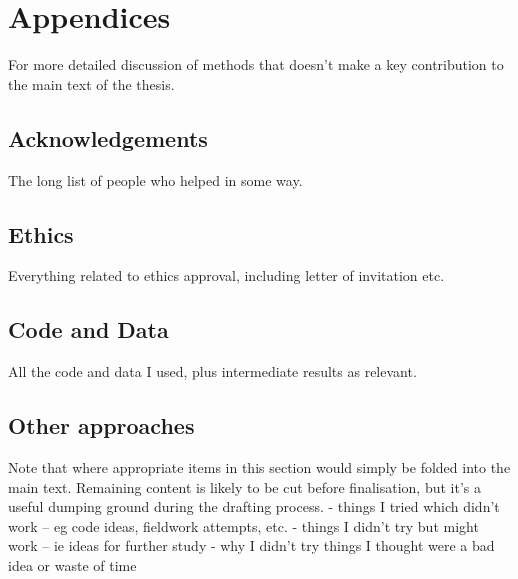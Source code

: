 \chapter{Appendices}
For more detailed discussion of methods that doesn't make a key contribution to the main text of the thesis.

\section{Acknowledgements}
The long list of people who helped in some way.

\section{Ethics} \label{sec:ethics}
Everything related to ethics approval, including letter of invitation etc.

\section{Code and Data}
All the code and data I used, plus intermediate results as relevant.

\section{Other approaches}
Note that where appropriate items in this section would simply be folded into the main text.  Remaining content is likely to be cut before finalisation, but it's a useful dumping ground during the drafting process.
-	things I tried which didn't work – eg code ideas, fieldwork attempts, etc.
-	things I didn't try but might work – ie ideas for further study
-	why I didn't try things I thought were a bad idea or waste of time


